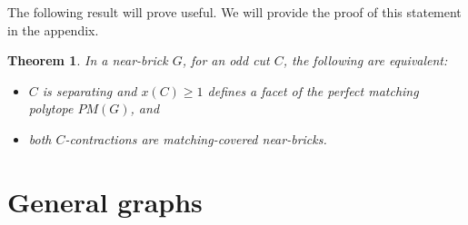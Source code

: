 \documentclass[11pt]{article}
\newcommand{\1}{\mathbf{1}}
\newcommand{\0}{\mathbf{0}}
\newtheorem{theorem}{Theorem}[section]
\begin{document}
The following result will prove useful. We will provide the proof of this statement in the appendix.
\begin{theorem}\label{thm:fdi-charact}
    In a near-brick $G$, for an odd cut $C$, the following are equivalent: \begin{itemize}
        \item $C$ is separating and $x(C)\geq 1$ defines a facet of the perfect matching polytope $PM(G)$, and
        \item both $C$-contractions are matching-covered near-bricks.
    \end{itemize} 
\end{theorem}
\section{General graphs}\label{sec:put-together}
\end{document}
